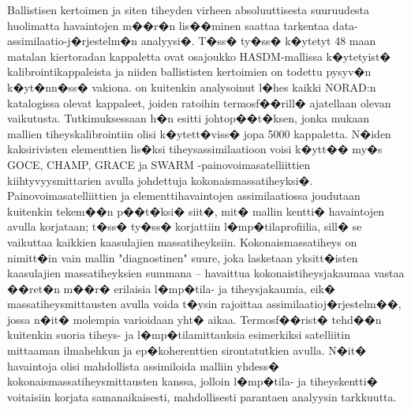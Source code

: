 \documentclass[12pt,a4paper,finnish,margin=2in]{article}
\begin{document}
Ballistisen kertoimen ja siten tiheyden virheen absoluuttisesta suuruudesta huolimatta havaintojen m��r�n lis��minen saattaa tarkentaa data-assimilaatio-j�rjestelm�n analyysi�. T�ss� ty�ss� k�ytetyt 48 maan matalan kiertoradan kappaletta ovat osajoukko HASDM-mallissa k�ytetyist� kalibrointikappaleista \citep{doornbos_2004} ja niiden ballististen kertoimien on todettu pysyv�n k�yt�nn�ss� vakiona. \citet{emmert_2008} on kuitenkin analysoinut l�hes kaikki NORAD:n katalogissa olevat kappaleet, joiden ratoihin termosf��rill� ajatellaan olevan vaikutusta. Tutkimuksessaan h�n esitti johtop��t�ksen, jonka mukaan mallien tiheyskalibrointiin olisi k�ytett�viss� jopa 5000 kappaletta. N�iden kaksirivisten elementtien lis�ksi tiheysassimilaatioon voisi k�ytt�� my�s GOCE, CHAMP, GRACE ja SWARM -painovoimasatelliittien kiihtyvyysmittarien avulla johdettuja kokonaismassatiheyksi�. Painovoimasatelliittien ja elementtihavaintojen assimilaatiossa joudutaan kuitenkin tekem��n p��t�ksi� siit�, mit� mallin kentti� havaintojen avulla korjataan; t�ss� ty�ss� korjattiin l�mp�tilaprofiilia, sill� se vaikuttaa kaikkien kaasulajien massatiheyksiin. Kokonaismassatiheys on nimitt�in vain mallin "diagnostinen" suure, joka lasketaan yksitt�isten kaasulajien massatiheyksien summana -- havaittua kokonaistiheysjakaumaa vastaa ��ret�n m��r� erilaisia l�mp�tila- ja tiheysjakaumia, eik� massatiheysmittausten avulla voida t�ysin rajoittaa assimilaatioj�rjestelm��, jossa n�it� molempia varioidaan yht� aikaa. Termosf��rist� tehd��n kuitenkin suoria tiheys- ja l�mp�tilamittauksia esimerkiksi satelliitin mittaaman ilmahehkun \citep[esim.][]{slanger_2017} ja ep�koherenttien sirontatutkien avulla. N�it� havaintoja olisi mahdollista assimiloida malliin yhdess� kokonaismassatiheysmittausten kanssa, jolloin l�mp�tila- ja tiheyskentti� voitaisiin korjata samanaikaisesti, mahdollisesti parantaen analyysin tarkkuutta. 
\end{document}
